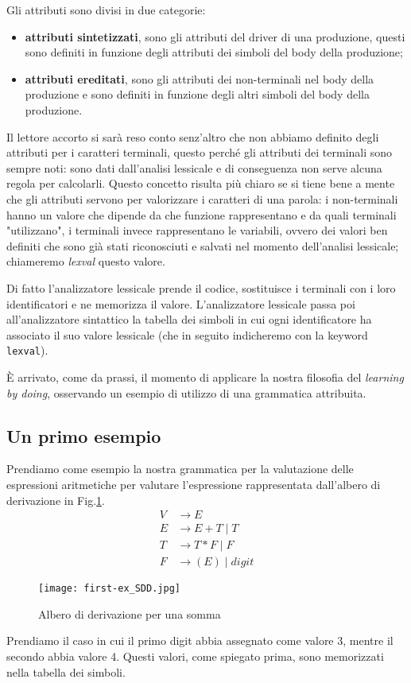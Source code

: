 \documentclass[class=book, crop=false, oneside, 12pt]{standalone}
\begin{document}
Gli attributi sono divisi in due categorie:
\begin{itemize}
    \item \textbf{attributi sintetizzati}, sono gli attributi del driver di una produzione, questi sono definiti in funzione degli attributi dei simboli del body della produzione;
    \item \textbf{attributi ereditati}, sono gli attributi dei non-terminali nel body della produzione e sono definiti in funzione degli altri simboli del body della produzione.
\end{itemize}
Il lettore accorto si sarà reso conto senz'altro che non abbiamo definito degli attributi per i caratteri terminali, questo perché gli attributi dei terminali sono sempre noti: sono dati dall'analisi lessicale e di conseguenza non serve alcuna regola per calcolarli.
Questo concetto risulta più chiaro se si tiene bene a mente che gli attributi servono per valorizzare i caratteri di una parola: i non-terminali hanno un valore che dipende da che funzione rappresentano e da quali terminali "utilizzano", i terminali invece rappresentano le variabili, ovvero dei valori ben definiti che sono già stati riconosciuti e salvati nel momento dell'analisi lessicale; chiameremo \emph{lexval} questo valore.

Di fatto l'analizzatore lessicale prende il codice, sostituisce i terminali con i loro identificatori e ne memorizza il valore.
L'analizzatore lessicale passa poi all'analizzatore sintattico la tabella dei simboli in cui ogni identificatore ha associato il suo valore lessicale (che in seguito indicheremo con la keyword \texttt{lexval}).

È arrivato, come da prassi, il momento di applicare la nostra filosofia del \emph{learning by doing}, osservando un esempio di utilizzo di una grammatica attribuita.

\subsection{Un primo esempio}
Prendiamo come esempio la nostra grammatica per la valutazione delle espressioni aritmetiche per valutare l'espressione rappresentata dall'albero di derivazione in Fig.\ref{fig:first-ex_SDD}.
\begin{align*}
    V &\to E \\
    E &\to E + T \mid T\\
    T &\to T * F \mid F\\
    F &\to (E) \mid digit
\end{align*}
\begin{figure}[H]
    \centering
    \texttt{[image: first-ex\_SDD.jpg]}
    \caption{Albero di derivazione per una somma}
    \label{fig:first-ex_SDD}
\end{figure}
Prendiamo il caso in cui il primo digit abbia assegnato come valore 3, mentre il secondo abbia valore 4.
Questi valori, come spiegato prima, sono memorizzati nella tabella dei simboli.
\end{document}
